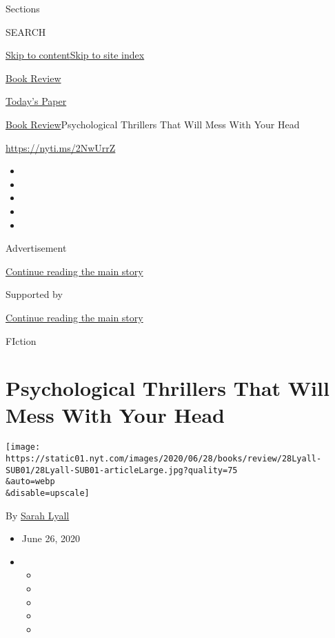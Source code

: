 Sections

SEARCH

\protect\hyperlink{site-content}{Skip to
content}\protect\hyperlink{site-index}{Skip to site index}

\href{https://www.nytimes.com/section/books/review}{Book Review}

\href{https://myaccount.nytimes.com/auth/login?response_type=cookie\&client_id=vi}{}

\href{https://www.nytimes.com/section/todayspaper}{Today's Paper}

\href{/section/books/review}{Book Review}\textbar{}Psychological
Thrillers That Will Mess With Your Head

\url{https://nyti.ms/2NwUrrZ}

\begin{itemize}
\item
\item
\item
\item
\item
\end{itemize}

Advertisement

\protect\hyperlink{after-top}{Continue reading the main story}

Supported by

\protect\hyperlink{after-sponsor}{Continue reading the main story}

FIction

\hypertarget{psychological-thrillers-that-will-mess-with-your-head}{%
\section{Psychological Thrillers That Will Mess With Your
Head}\label{psychological-thrillers-that-will-mess-with-your-head}}

\texttt{[image: https://static01.nyt.com/images/2020/06/28/books/review/28Lyall-SUB01/28Lyall-SUB01-articleLarge.jpg?quality=75\\\&auto=webp\\\&disable=upscale]}

By \href{https://www.nytimes.com/by/sarah-lyall}{Sarah Lyall}

\begin{itemize}
\item
  June 26, 2020
\item
  \begin{itemize}
  \item
  \item
  \item
  \item
  \item
  \end{itemize}
\end{itemize}

